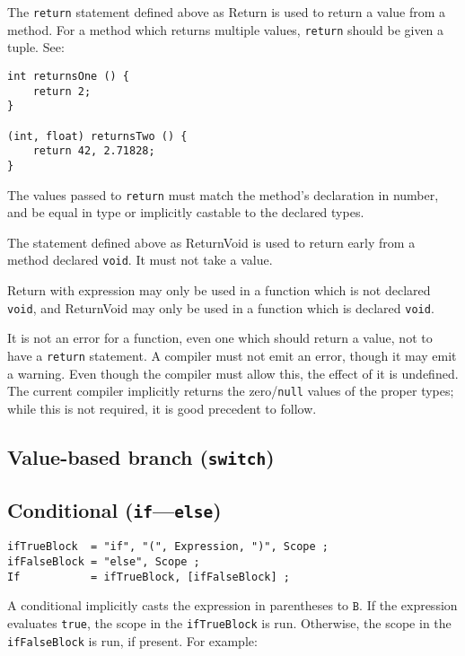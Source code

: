 \documentclass{article}
\newcommand{\R}[1]{\mathtt{#1}}
\begin{document}
The \texttt{return} statement defined above as Return is used to return a
value from a method. For a method which returns multiple values,
\texttt{return} should be given a tuple. See:
\begin{verbatim}
int returnsOne () {
    return 2;
}

(int, float) returnsTwo () {
    return 42, 2.71828;
}
\end{verbatim}

The values passed to \texttt{return} must match the method's declaration in
number, and be equal in type or implicitly castable to the declared types.

The statement defined above as ReturnVoid is used to return early from a
method declared \texttt{void}. It must not take a value.

Return with expression may only be used in a function which is not declared
\texttt{void}, and ReturnVoid may only be used in a function which is declared
\texttt{void}.

It is not an error for a function, even one which should return a value, not
to have a \texttt{return} statement. A compiler must not emit an error, though
it may emit a warning. Even though the compiler must allow this, the effect of
it is undefined. The current compiler implicitly returns the
zero/\texttt{null} values of the proper types; while this is not required, it
is good precedent to follow.

\subsection{Value-based branch (\texttt{switch})}
\label{sub:statements:switch}

\subsection{Conditional (\texttt{if}---\texttt{else})}
\label{sub:statements:if}
\begin{verbatim}
ifTrueBlock  = "if", "(", Expression, ")", Scope ;
ifFalseBlock = "else", Scope ;
If           = ifTrueBlock, [ifFalseBlock] ;
\end{verbatim}

A conditional implicitly casts the expression in parentheses to $\R{B}$. If
the expression evaluates \texttt{true}, the scope in the \texttt{ifTrueBlock}
is run. Otherwise, the scope in the \texttt{ifFalseBlock} is run, if present.
For example:
\end{document}
